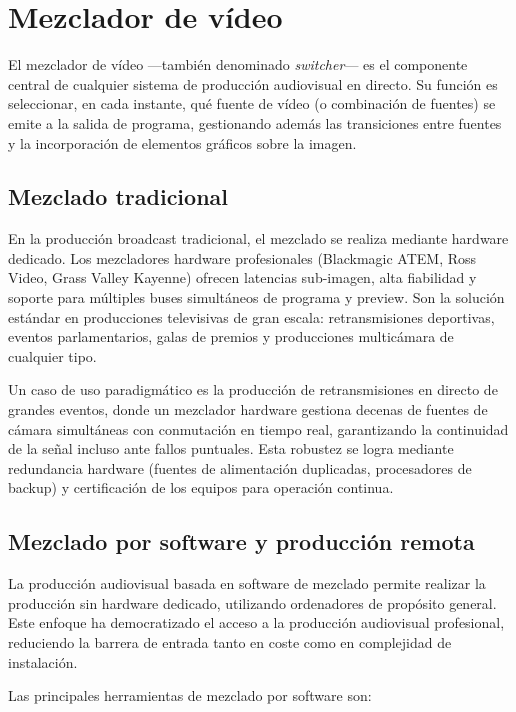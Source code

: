 \section{Mezclador de vídeo}

El mezclador de vídeo ---también denominado \textit{switcher}--- es el componente
central de cualquier sistema de producción audiovisual en directo. Su función es
seleccionar, en cada instante, qué fuente de vídeo (o combinación de fuentes) se emite
a la salida de programa, gestionando además las transiciones entre fuentes y la
incorporación de elementos gráficos sobre la imagen.

\subsection{Mezclado tradicional}

En la producción broadcast tradicional, el mezclado se realiza mediante hardware
dedicado. Los mezcladores hardware profesionales (Blackmagic ATEM, Ross Video,
Grass Valley Kayenne) ofrecen latencias sub-imagen, alta fiabilidad y soporte para
múltiples buses simultáneos de programa y preview. Son la solución estándar en
producciones televisivas de gran escala: retransmisiones deportivas, eventos
parlamentarios, galas de premios y producciones multicámara de cualquier tipo.

Un caso de uso paradigmático es la producción de retransmisiones en directo de grandes
eventos, donde un mezclador hardware gestiona decenas de fuentes de cámara simultáneas
con conmutación en tiempo real, garantizando la continuidad de la señal incluso ante
fallos puntuales. Esta robustez se logra mediante redundancia hardware (fuentes de
alimentación duplicadas, procesadores de backup) y certificación de los equipos para
operación continua.

\subsection{Mezclado por software y producción remota}

La producción audiovisual basada en software de mezclado permite realizar la producción
sin hardware dedicado, utilizando ordenadores de propósito general. Este enfoque ha
democratizado el acceso a la producción audiovisual profesional, reduciendo la barrera
de entrada tanto en coste como en complejidad de instalación.

Las principales herramientas de mezclado por software son:


